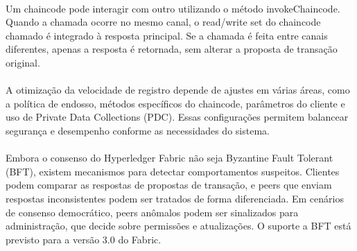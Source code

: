 \documentclass[letterpaper,11pt,leqno]{article}
\begin{document}
\paragraph{}
Um chaincode pode interagir com outro utilizando o método invokeChaincode.
Quando a chamada ocorre no mesmo canal, o read/write set do chaincode chamado é
integrado à resposta principal. Se a chamada é feita entre canais diferentes,
apenas a resposta é retornada, sem alterar a proposta de transação original.

\paragraph{}
A otimização da velocidade de registro depende de ajustes em várias áreas, como
a política de endosso, métodos específicos do chaincode, parâmetros do cliente e
uso de Private Data Collections (PDC). Essas configurações permitem balancear
segurança e desempenho conforme as necessidades do sistema.

\paragraph{}
Embora o consenso do Hyperledger Fabric não seja Byzantine Fault Tolerant (BFT),
existem mecanismos para detectar comportamentos suspeitos. Clientes podem
comparar as respostas de propostas de transação, e peers que enviam respostas
inconsistentes podem ser tratados de forma diferenciada. Em cenários de consenso
democrático, peers anômalos podem ser sinalizados para administração, que decide
sobre permissões e atualizações. O suporte a BFT está previsto para a versão 3.0
do Fabric.

% 
\end{document}
